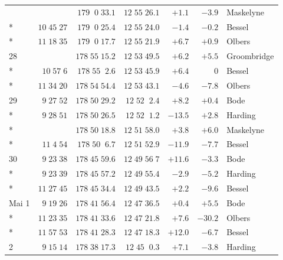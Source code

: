 \begin{longtable}{lrrrrrl}
 &  & $179\;\;0\;33.1$ & $12\;55\;26.1$ & $+1.1$ & $-3.9$ & Maskelyne \\*
 & $10\;45\;27$ & $179\;\;0\;25.4$ & $12\;55\;24.0$ & $-1.4$ & $-0.2$ & Bessel \\*
 & $11\;18\;35$ & $179\;\;0\;17.7$ & $12\;55\;21.9$ & $+6.7$ & $+0.9$ & Olbers \\
28 &  & $178\;55\;15.2$ & $12\;53\;49.5$ & $+6.2$ & $+5.5$ & Groombridge \\*
 & $10\;57\;6$ & $178\;55\;\;2.6$ & $12\;53\;45.9$ & $+6.4$ & $0$ & Bessel \\*
 & $11\;34\;20$ & $178\;54\;54.4$ & $12\;53\;43.1$ & $-4.6$ & $-7.8$ & Olbers \\
29 & $9\;27\;52$ & $178\;50\;29.2$ & $12\;52\;\;2.4$ & $+8.2$ & $+0.4$ & Bode \\*
 & $9\;28\;51$ & $178\;50\;26.5$ & $12\;52\;\;1.2$ & $-13.5$ & $+2.8$ & Harding \\*
 &  & $178\;50\;18.8$ & $12\;51\;58.0$ & $+3.8$ & $+6.0$ & Maskelyne \\*
 & $11\;4\;54$ & $178\;50\;\;6.7$ & $12\;51\;52.9$ & $-11.9$ & $-7.7$ & Bessel \\
30 & $9\;23\;38$ & $178\;45\;59.6$ & $12\;49\;56\;7$ & $+11.6$ & $-3.3$ & Bode \\*
 & $9\;23\;39$ & $178\;45\;57.2$ & $12\;49\;55.4$ & $-2.9$ & $-5.2$ & Harding \\*
 & $11\;27\;45$ & $178\;45\;34.4$ & $12\;49\;43.5$ & $+2.2$ & $-9.6$ & Bessel \\
Mai 1 & $9\;19\;26$ & $178\;41\;56.4$ & $12\;47\;36.5$ & $+0.4$ & $+5.5$ & Bode \\*
 & $11\;23\;35$ & $178\;41\;33.6$ & $12\;47\;21.8$ & $+7.6$ & $-30.2$ & Olbers \\*
 & $11\;57\;53$ & $178\;41\;28.3$ & $12\;47\;18.3$ & $+12.0$ & $-6.7$ & Bessel \\
2 & $9\;15\;14$ & $178\;38\;17.3$ & $12\;45\;\;0.3$ & $+7.1$ & $-3.8$ & Harding \\
\end{longtable}
\endgroup

